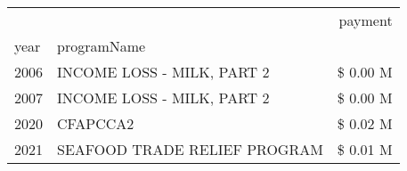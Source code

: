 \begin{tabular}{llr}
\toprule
 &  & payment \\
year & programName &  \\
\midrule
2006 & INCOME LOSS - MILK, PART 2 & \$ 0.00 M \\
\cline{1-3}
2007 & INCOME LOSS - MILK, PART 2 & \$ 0.00 M \\
\cline{1-3}
2020 & CFAPCCA2 & \$ 0.02 M \\
\cline{1-3}
2021 & SEAFOOD TRADE RELIEF PROGRAM & \$ 0.01 M \\
\cline{1-3}
\bottomrule
\end{tabular}

